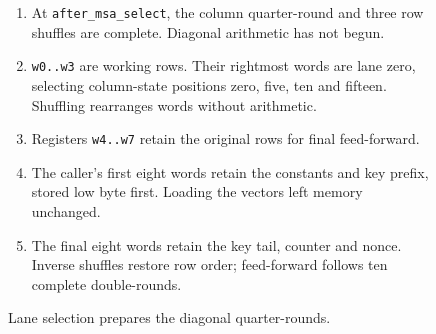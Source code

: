 \begin{figure}[htbp]
\begin{minipage}{\linewidth}
\begin{enumerate}
      \setlength{\itemsep}{0pt}
            \setlength{\parsep}{0pt}
      \item At \texttt{after\_msa\_select}, the column quarter-round and three row shuffles are complete. Diagonal arithmetic has not begun.
      \item \texttt{w0..w3} are working rows. Their rightmost words are lane zero, selecting column-state positions zero, five, ten and fifteen. Shuffling rearranges words without arithmetic.
      \item Registers \texttt{w4..w7} retain the original rows for final feed-forward.
      \item The caller's first eight words retain the constants and key prefix, stored low byte first. Loading the vectors left memory unchanged.
      \item The final eight words retain the key tail, counter and nonce. Inverse shuffles restore row order; feed-forward follows ten complete double-rounds.
    \end{enumerate}
  \end{minipage}
  \caption{Lane selection prepares the diagonal quarter-rounds.}
  \label{capture:026-chacha20-f03}
  \label{chacha-f03}
\end{figure}
\par
